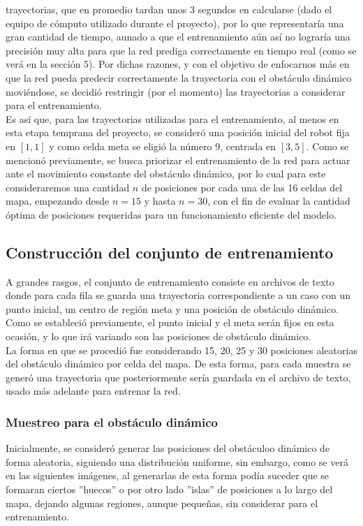 \documentclass[spanish,mexico]{article}
\numberwithin{equation}{section}
\theoremstyle{definition}
\theoremstyle{remark}
\begin{document}
trayectorias, que en promedio tardan unos 3 segundos en calcularse (dado el equipo de cómputo utilizado durante el proyecto), por lo que representaría una gran cantidad de tiempo, aunado a que el entrenamiento aún así no lograría una precisión muy alta para que la red prediga correctamente en tiempo real (como se verá en la sección 5). Por dichas razones, y con el objetivo de enfocarnos más en que la red pueda predecir correctamente la trayectoria con el obstáculo dinámico moviéndose, se decidió restringir (por el momento) las trayectorias a considerar para el entrenamiento.\\

Es así que, para las trayectorias utilizadas para el entrenamiento, al menos en esta etapa temprana del proyecto, se consideró una posición inicial del robot fija en $[1, 1]$ y como celda meta se eligió la número 9, centrada en $[3, 5]$. Como se mencionó previamente, se busca priorizar el entrenamiento de la red para actuar ante el movimiento constante del obstáculo dinámico, por lo cual para este consideraremos una cantidad $n$ de posiciones por cada una de las 16 celdas del mapa, empezando desde $n=15$ y hasta $n=30$, con el fin de evaluar la cantidad óptima de posiciones requeridas para un funcionamiento eficiente del modelo. 

\subsection{Construcción del conjunto de entrenamiento}

A grandes rasgos, el conjunto de entrenamiento consiste en archivos de texto donde para cada fila se guarda una trayectoria correspondiente a un caso con un punto inicial, un centro de región meta y una posición de obstáculo dinámico. Como se estableció previamente, el punto inicial y el meta serán fijos en esta ocasión, y lo que irá variando son las posiciones de obstáculo dinámico.\\

La forma en que se procedió fue considerando 15, 20, 25 y 30 posiciones aleatorias del obstáculo dinámico por celda del mapa. De esta forma, para cada muestra se generó una trayectoria que posteriormente sería guardada en el archivo de texto, usado más adelante para entrenar la red.


\subsubsection{Muestreo para el obstáculo dinámico}
Inicialmente, se consideró generar las posiciones del obstáculoo dinámico de forma aleatoria, siguiendo una distribución uniforme, sin embargo, como se verá en las siguientes imágenes, al generarlas de esta forma podía suceder que se formaran ciertos ''huecos'' o por otro lado ''islas'' de posiciones a lo largo del mapa, dejando algunas regiones, aunque pequeñas, sin considerar para el entrenamiento.\\
\end{document}
